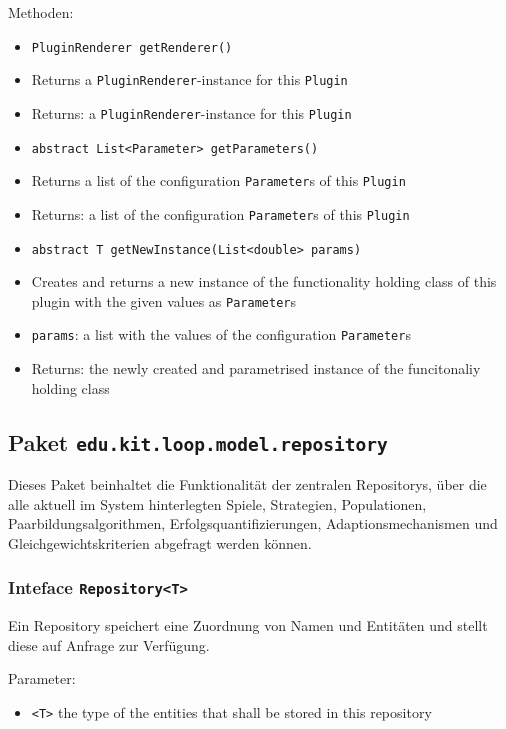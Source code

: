 \documentclass[parskip=full,11pt]{scrartcl}
\begin{document}
Methoden:
\begin{itemize}\itemsep -10pt
	\item \texttt{PluginRenderer getRenderer()}
	\item[] Returns a \texttt{PluginRenderer}-instance for this \texttt{Plugin}
	\item[] Returns: a \texttt{PluginRenderer}-instance for this \texttt{Plugin}
	
	\item \texttt{abstract List<Parameter> getParameters()}
	\item[] Returns a list of the configuration \texttt{Parameter}s of this \texttt{Plugin}
	\item[] Returns: a list of the configuration \texttt{Parameter}s of this \texttt{Plugin}
	
	\item \texttt{abstract T getNewInstance(List<double> params)}
	\item[] Creates and returns a new instance of the functionality holding class of this plugin with the given values as \texttt{Parameter}s
	\item[] \texttt{params}: a list with the values of the configuration \texttt{Parameter}s
	\item[] Returns: the newly created and parametrised instance of the funcitonaliy holding class
\end{itemize}

\subsection{Paket \texttt{edu.kit.loop.model.repository}}
Dieses Paket beinhaltet die Funktionalität der zentralen Repositorys, über die alle aktuell im System hinterlegten Spiele, Strategien, Populationen, Paarbildungsalgorithmen, Erfolgsquantifizierungen, Adaptionsmechanismen und Gleichgewichtskriterien abgefragt werden können.


\subsubsection{Inteface \texttt{Repository<T>}}

Ein Repository speichert eine Zuordnung von Namen und Entitäten und stellt diese auf Anfrage zur Verfügung.

Parameter:
\begin{itemize}\itemsep -10pt
	\item \texttt{<T>} the type of the entities that shall be stored in this repository
\end{itemize}
\end{document}

